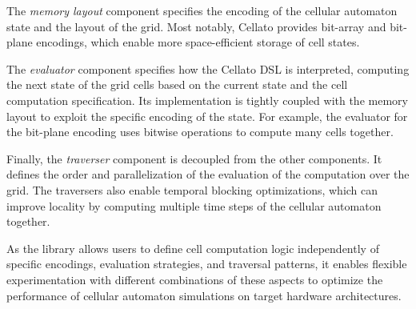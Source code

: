 The \emph{memory layout} component specifies the encoding of the cellular automaton state and the layout of the grid. Most notably, Cellato provides bit-array and bit-plane encodings, which enable more space-efficient storage of cell states.

The \emph{evaluator} component specifies how the Cellato DSL is interpreted, computing the next state of the grid cells based on the current state and the cell computation specification. Its implementation is tightly coupled with the memory layout to exploit the specific encoding of the state. For example, the evaluator for the bit-plane encoding uses bitwise operations to compute many cells together.

Finally, the \emph{traverser} component is decoupled from the other components. It defines the order and parallelization of the evaluation of the computation over the grid. The traversers also enable temporal blocking optimizations, which can improve locality by computing multiple time steps of the cellular automaton together.

As the library allows users to define cell computation logic independently of specific encodings, evaluation strategies, and traversal patterns, it enables flexible experimentation with different combinations of these aspects to optimize the performance of cellular automaton simulations on target hardware architectures.
